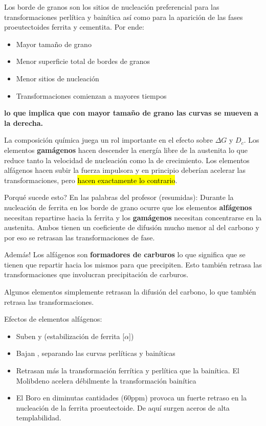 Los borde de granos son los sitios de nucleación preferencial para las transformaciones perlítica y bainítica así como para la aparición de las fases proeutectoides ferrita y cementita. Por ende:
\begin{itemize}
    \item Mayor tamaño de grano \goright
    \item[\goright] Menor superficie total de bordes de granos \goright
    \item[\goright] Menor sitios de nucleación \goright
    \item[\goright] Transformaciones comienzan a mayores tiempos
\end{itemize}
\textbf{lo que implica que con mayor tamaño de grano las curvas se mueven a la derecha.}

La composición química juega un rol importante en el efecto sobre $\Delta G$ y $D_c$. Los elementos \textbf{gamágenos} hacen descender la energía libre de la austenita lo que reduce tanto la velocidad de nucleación como la de crecimiento. Los elementos alfágenos hacen subir la fuerza impulsora y en principio deberían acelerar las transformaciones, pero \hl{hacen exactamente lo contrario}.

Porqué sucede esto? En las palabras del profesor (resumidas): Durante la nucleación de ferrita en los borde de grano ocurre que los elementos \textbf{alfágenos} necesitan repartirse hacia la ferrita y los \textbf{gamágenos} necesitan concentrarse en la austenita. Ambos tienen un coeficiente de difusión mucho menor al del carbono y por eso se retrasan las transformaciones de fase.

Además! Los alfágenos son \textbf{formadores de carburos} lo que significa que se tienen que repartir hacia los mismos para que precipiten. Esto también retrasa las transformaciones que involucran precipitación de carburos. 

Algunos elementos simplemente retrasan la difusión del carbono, lo que también retrasa las transformaciones.

Efectos de elementos alfágenos:
\begin{itemize}
    \item Suben \Aone y \Athree (estabilización de ferrita [$\alpha$])
    \item Bajan \Bs, separando las curvas perlíticas y bainíticas
    \item Retrasan más la transformación ferrítica y perlítica que la bainítica. El Molibdeno acelera débilmente la transformación bainítica
    \item El Boro en diminutas cantidades (60ppm) provoca un fuerte retraso en la nucleación de la ferrita proeutectoide. De aquí surgen aceros de alta templabilidad.
\end{itemize}

